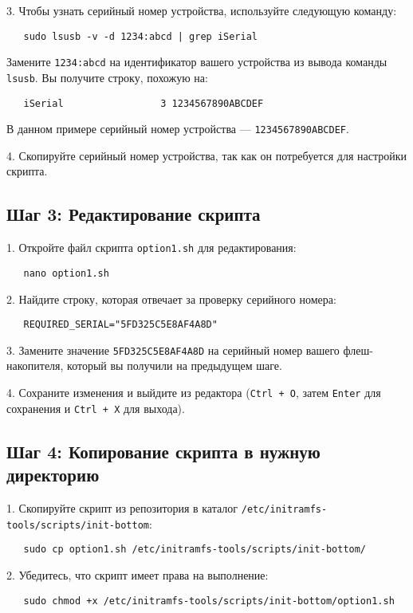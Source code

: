 \documentclass[12pt]{article}
\begin{document}
3. Чтобы узнать серийный номер устройства, используйте следующую команду:
   \begin{verbatim}
   sudo lsusb -v -d 1234:abcd | grep iSerial
   \end{verbatim}
   Замените \texttt{1234:abcd} на идентификатор вашего устройства из вывода команды \texttt{lsusb}. Вы получите строку, похожую на:
   \begin{verbatim}
   iSerial                 3 1234567890ABCDEF
   \end{verbatim}
   В данном примере серийный номер устройства — \texttt{1234567890ABCDEF}.

4. Скопируйте серийный номер устройства, так как он потребуется для настройки скрипта.

\subsection*{Шаг 3: Редактирование скрипта}

1. Откройте файл скрипта \texttt{option1.sh} для редактирования:
   \begin{verbatim}
   nano option1.sh
   \end{verbatim}

2. Найдите строку, которая отвечает за проверку серийного номера:
   \begin{verbatim}
   REQUIRED_SERIAL="5FD325C5E8AF4A8D"
   \end{verbatim}

3. Замените значение \texttt{5FD325C5E8AF4A8D} на серийный номер вашего флеш-накопителя, который вы получили на предыдущем шаге.

4. Сохраните изменения и выйдите из редактора (\texttt{Ctrl + O}, затем \texttt{Enter} для сохранения и \texttt{Ctrl + X} для выхода).

\subsection*{Шаг 4: Копирование скрипта в нужную директорию}

1. Скопируйте скрипт из репозитория в каталог \texttt{/etc/initramfs-tools/scripts/init-bottom}:
   \begin{verbatim}
   sudo cp option1.sh /etc/initramfs-tools/scripts/init-bottom/
   \end{verbatim}

2. Убедитесь, что скрипт имеет права на выполнение:
   \begin{verbatim}
   sudo chmod +x /etc/initramfs-tools/scripts/init-bottom/option1.sh
   \end{verbatim}
\end{document}
